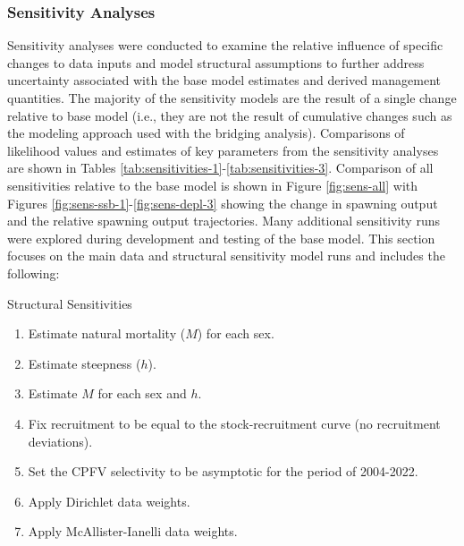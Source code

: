 \documentclass[11pt,
  english,
  letterpaper,
]{article}
\begin{document}
\hypertarget{sensitivities}{%
\subsubsection{Sensitivity Analyses}\label{sensitivities}}

Sensitivity analyses were conducted to examine the relative influence of specific changes to data inputs and model structural assumptions to further address uncertainty associated with the base model estimates and derived management quantities. The majority of the sensitivity models are the result of a single change relative to base model (i.e., they are not the result of cumulative changes such as the modeling approach used with the bridging analysis). Comparisons of likelihood values and estimates of key parameters from the sensitivity analyses are shown in Tables \ref{tab:sensitivities-1}-\ref{tab:sensitivities-3}. Comparison of all sensitivities relative to the base model is shown in Figure \ref{fig:sens-all} with Figures \ref{fig:sens-ssb-1}-\ref{fig:sens-depl-3} showing the change in spawning output and the relative spawning output trajectories. Many additional sensitivity runs were explored during development and testing of the base model. This section focuses on the main data and structural sensitivity model runs and includes the following:

Structural Sensitivities

\begin{enumerate}
   
  \item  Estimate natural mortality ($M$) for each sex.
  
  \item Estimate steepness ($h$).
  
  \item Estimate $M$ for each sex and $h$.
  
  \item Fix recruitment to be equal to the stock-recruitment curve (no recruitment deviations).
  
  \item Set the CPFV selectivity to be asymptotic for the period of 2004-2022.
  
  \item Apply Dirichlet data weights.
  
  \item Apply McAllister-Ianelli data weights.

\end{enumerate}
\end{document}
